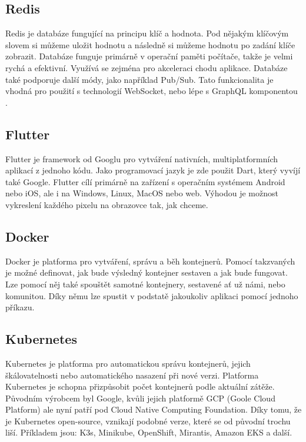 \subsection{Redis}
Redis je databáze fungující na principu klíč a hodnota. Pod nějakým klíčovým slovem si můžeme uložit hodnotu a následně si můžeme hodnotu po zadání klíče zobrazit. Databáze funguje primárně v operační paměti počítače, takže je velmi rychá a efektivní. Využívá se zejména pro akceleraci chodu aplikace. Databáze také podporuje další módy, jako například Pub/Sub\cite{PubSub}. Tato funkcionalita je vhodná pro použití s technologií WebSocket, nebo lépe s GraphQL komponentou .

\subsection{Flutter}
Flutter je framework od Googlu pro vytváření nativních, multiplatformních aplikací z jednoho kódu. \cite{Flutter} Jako programovací jazyk je zde použit Dart, který vyvíjí také Google. Flutter cílí primárně na zařízení s operačním systémem Android nebo iOS, ale i na Windows, Linux, MacOS nebo web. Výhodou je možnost vykreslení každého pixelu na obrazovce tak, jak chceme.

\subsection{Docker}
Docker je platforma pro vytváření, správu a běh kontejnerů. Pomocí takzvaných  je možné definovat, jak bude výsledný kontejner sestaven a jak bude fungovat. Lze pomocí něj také spouštět samotné kontejnery, sestavené ať už námi, nebo komunitou. Díky němu lze spustit v podstatě jakoukoliv aplikaci pomocí jednoho příkazu.

\subsection{Kubernetes}
Kubernetes je platforma pro automatickou správu kontejnerů, jejich škálovatelnosti nebo automatického nasazení při nové verzi. Platforma Kubernetes je schopna přizpůsobit počet kontejnerů podle aktuální zátěže. 
Původním výrobcem byl Google, kvůli jejich platformě GCP (Goole Cloud Platform) ale nyní patří pod Cloud Native Computing Foundation. Díky tomu, že je Kubernetes open-source, vznikají podobné verze, které se od původní trochu liší. Příkladem jsou: K3s, Minikube, OpenShift, Mirantis, Amazon EKS a další.

